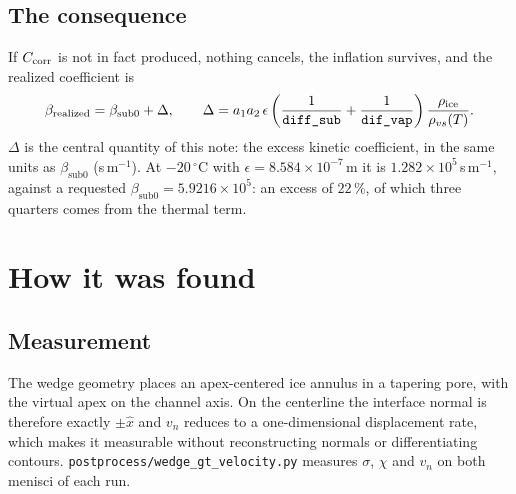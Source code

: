 \documentclass[11pt,a4paper]{article}
\newcommand{\code}[1]{\texttt{\small #1}}
\newcommand{\vn}{v_n}
\newcommand{\bsub}{\beta_{\mathrm{sub0}}}
\begin{document}
\subsection{The consequence}
If $C_{\rm corr}$ is not in fact produced, nothing cancels, the inflation survives, and
the realized coefficient is
\begin{equation}
\beta_{\rm realized}=\bsub+\Delta,
\qquad
\Delta = a_1a_2\,\epsilon\left(\frac{1}{\texttt{diff\_sub}}+\frac{1}{\texttt{dif\_vap}}\right)
\frac{\rho_{\rm ice}}{\rho_{vs}(T)} .
\label{eq:delta}
\end{equation}
$\Delta$ is the central quantity of this note: the excess kinetic coefficient, in the
same units as $\bsub$ (s\,m$^{-1}$). At $-20\,^\circ$C with $\epsilon=8.584\times10^{-7}$\,m
it is $1.282\times10^{5}$\,s\,m$^{-1}$, against a requested
$\bsub=5.9216\times10^{5}$: an excess of $22\,\%$, of which three quarters comes from the
thermal term.

\section{How it was found}

\subsection{Measurement}
The wedge geometry places an apex-centered ice annulus in a tapering pore, with the
virtual apex on the channel axis. On the centerline the interface normal is therefore
exactly $\pm\hat x$ and $\vn$ reduces to a one-dimensional displacement rate, which makes
it measurable without reconstructing normals or differentiating contours.
\code{postprocess/wedge\_gt\_velocity.py} measures $\sigma$, $\chi$ and $\vn$ on both
menisci of each run.
\end{document}
